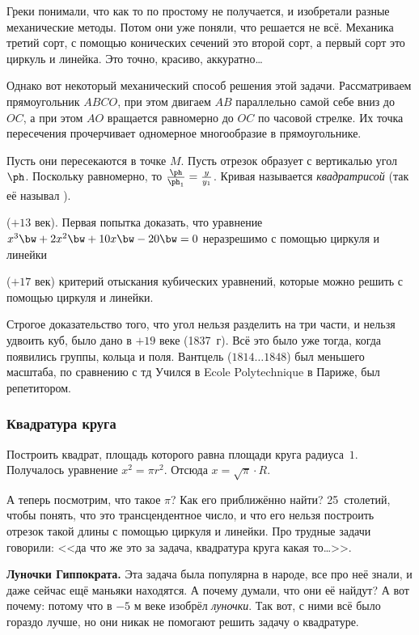 \documentclass[a4paper,oneside,fleqn,10pt]{article}
\newcommand{\pe}[2]{${#1}\ldots{#2}$}
\newcommand{\cpic}[1]{$$\epsfbox{pictures.#1}$$}
\begin{document}
Греки понимали, что как то по простому не получается, и изобретали разные механические
методы. Потом они уже поняли, что решается не всё. Механика третий сорт, с помощью конических сечений
это второй сорт, а первый сорт это циркуль и линейка. Это точно, красиво, аккуратно\ldots

Однако вот некоторый механический способ решения этой задачи.
Рассматриваем прямоугольник $ABCO$, при этом двигаем $AB$ параллельно самой себе вниз
до $OC$, а при этом $AO$ вращается равномерно до $OC$ по часовой стрелке.
Их точка пересечения прочерчивает одномерное многообразие в прямоугольнике.



Пусть они пересекаются в точке $M$.  Пусть отрезок образует с вертикалью угол $\ph$.
Поскольку равномерно, то $\frac{\ph}{\ph_1} = \frac{y}{y_1}$.
Кривая называется \emph{квадратрисой} (так её называл ).

 ($+13$ век). Первая попытка доказать, что уравнение $x^3 \bw+ 2x^2 \bw+ 10x \bw- 20 \bw= 0$
неразрешимо с помощью циркуля и линейки 

 ($+17$ век) критерий отыскания кубических уравнений, которые можно решить с помощью циркуля и линейки.

Строгое доказательство того, что угол нельзя разделить на три части,  и нельзя удвоить куб,
было дано  в $+19$ веке (1837~г).
Всё это было уже тогда, когда появились группы, кольца
и поля. Вантцель (\pe{1814}{1848}) был меньшего масштаба, по сравнению с  тд
Учился в Ecole Polytechnique в Париже, был репетитором.

\subsubsection{Квадратура круга}

Построить квадрат, площадь которого равна площади круга радиуса~$1$.
Получалось уравнение $x^2 = \pi r^2$. Отсюда $x = \sqrt\pi \cdot R$.

А теперь посмотрим, что такое $\pi$?
Как его приближённо найти? 25~столетий, чтобы понять, что это трансцендентное число,
и что его нельзя построить отрезок такой длины с помощью циркуля и линейки.
Про трудные задачи говорили: <<да что же это за задача, квадратура круга какая то\ldots>>.


\textbf{Луночки Гиппократа.}
Эта задача была популярна в народе, все про неё знали, и даже сейчас ещё маньяки находятся.
А почему думали, что они её найдут? А вот почему: потому что  в $-5$ м веке
изобрёл \emph{луночки}.
Так вот, с ними всё было гораздо лучше, но они никак не помогают решить задачу о квадратуре.
\end{document}

